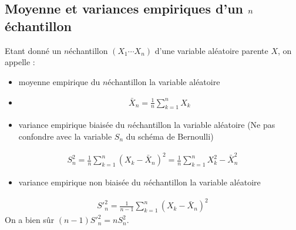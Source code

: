 \documentclass[letterpaper,10pt,english]{jupyterBook}
\begin{document}
\subsection{Moyenne et variances empiriques d’un \protect\(n\protect\)\sphinxhyphen{}échantillon}
\label{\detokenize{elemstats:moyenne-et-variances-empiriques-d-un-n-echantillon}}
\sphinxAtStartPar
Etant donné un \(n\)\sphinxhyphen{}échantillon \((X_1\cdots X_n)\) d’une variable aléatoire parente \(X\), on appelle :

\ignorespaces 
{}\ignorespaces \begin{itemize}
\item {} 
\sphinxAtStartPar
moyenne empirique du \(n\)\sphinxhyphen{}échantillon la variable aléatoire

\item {} \begin{equation*}
\begin{split}\bar{X}_n=\frac1n \displaystyle\sum_{k=1}^n X_k\end{split}
\end{equation*}
\item {} 
\sphinxAtStartPar
variance empirique biaisée du \(n\)\sphinxhyphen{}échantillon la variable aléatoire (Ne pas confondre avec la variable \(S_n\) du schéma de Bernoulli)

\end{itemize}
\begin{equation*}
\begin{split}S_n^2=\frac1n \displaystyle\sum_{k=1}^n (X_k-\bar{X}_n)^2=\frac1n \displaystyle\sum_{k=1}^n X_k^2 -\bar{X}_n^2\end{split}
\end{equation*}\begin{itemize}
\item {} 
\sphinxAtStartPar
variance empirique non biaisée du \(n\)\sphinxhyphen{}échantillon la variable aléatoire

\end{itemize}
\begin{equation*}
\begin{split}{S'}_n^2=\frac{1}{n-1} \displaystyle\sum_{k=1}^n (X_k-\bar{X}_n)^2\end{split}
\end{equation*}
\sphinxAtStartPar
On a bien sûr \((n-1){S'}_n^2=nS_n^2\).
\end{document}
